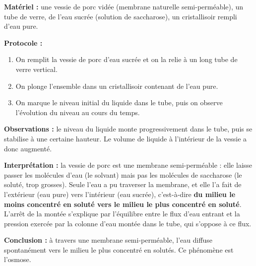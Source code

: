 \documentclass[11pt]{article}
\newcommand{\cle}[1]{{\popxbold\color{popdark}#1}}
\begin{document}
\begin{experience}
\textbf{Matériel :} une vessie de porc vidée (membrane naturelle semi-perméable), un tube de verre, de l'eau sucrée (solution de saccharose), un cristallisoir rempli d'eau pure.

\textbf{Protocole :}
\begin{enumerate}
\item On remplit la vessie de porc d'eau sucrée et on la relie à un long tube de verre vertical.
\item On plonge l'ensemble dans un cristallisoir contenant de l'eau pure.
\item On marque le niveau initial du liquide dans le tube, puis on observe l'évolution du niveau au cours du temps.
\end{enumerate}

\textbf{Observations :} le niveau du liquide monte progressivement dans le tube, puis se stabilise à une certaine hauteur. Le volume de liquide à l'intérieur de la vessie a donc augmenté.

\textbf{Interprétation :} la vessie de porc est une membrane \cle{semi-perméable} : elle laisse passer les molécules d'eau (le solvant) mais pas les molécules de saccharose (le soluté, trop grosses). Seule l'eau a pu traverser la membrane, et elle l'a fait de l'extérieur (eau pure) vers l'intérieur (eau sucrée), c'est-à-dire \textbf{du milieu le moins concentré en soluté vers le milieu le plus concentré en soluté}. L'arrêt de la montée s'explique par l'équilibre entre le flux d'eau entrant et la pression exercée par la colonne d'eau montée dans le tube, qui s'oppose à ce flux.

\textbf{Conclusion :} à travers une membrane semi-perméable, l'eau diffuse spontanément vers le milieu le plus concentré en solutés. Ce phénomène est l'\cle{osmose}.
\end{experience}
\end{document}
